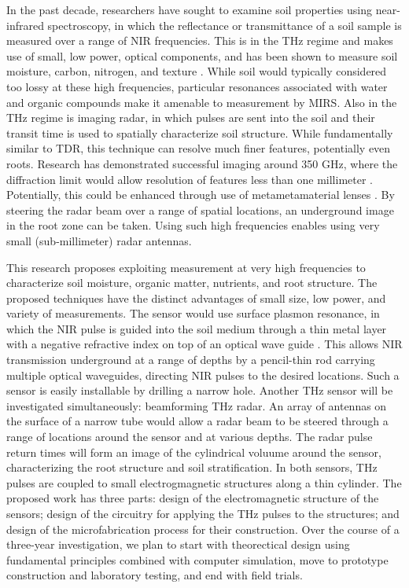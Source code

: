 \documentclass[11pt,letterpaper]{article}
\begin{document}
In the past decade, researchers have sought to examine soil properties using near-infrared spectroscopy, in which the reflectance or transmittance of a soil sample is measured over a range of NIR frequencies. This is in the THz regime and makes use of small, low power, optical components, and has been shown to measure soil moisture, carbon, nitrogen, and texture \cite{chang2001near}. While soil would typically considered too lossy at these high frequencies, particular resonances associated with water and organic compounds make it amenable to measurement by MIRS. Also in the THz regime is imaging radar, in which pulses are sent into the soil and their transit time is used to spatially characterize soil structure. While fundamentally similar to TDR, this technique can resolve much finer features, potentially even roots. Research has demonstrated successful imaging around 350 GHz, where the diffraction limit would allow resolution of features less than one millimeter \cite{dworak2011application}. Potentially, this could be enhanced through use of metametamaterial lenses \cite{}. By steering the radar beam over a range of spatial locations, an underground image in the root zone can be taken. Using such high frequencies enables using very small (sub-millimeter) radar antennas.

This research proposes exploiting measurement at very high frequencies to characterize soil moisture, organic matter, nutrients, and root structure. The proposed techniques have the distinct advantages of small size, low power, and variety of measurements. The sensor would use surface plasmon resonance, in which the NIR pulse is guided into the soil medium through a thin metal layer with a negative refractive index on top of an optical wave guide \cite{shibayama2016surface}. This allows NIR transmission underground at a range of depths by a pencil-thin rod carrying multiple optical waveguides, directing NIR pulses to the desired locations. Such a sensor is easily installable by drilling a narrow hole. Another THz sensor will be investigated simultaneously: beamforming THz radar. An array of antennas on the surface of a narrow tube would allow a radar beam to be steered through a range of locations around the sensor and at various depths. The radar pulse return times will form an image of the cylindrical voluume around the sensor, characterizing the root structure and soil stratification. In both sensors, THz pulses are coupled to small electrogmagnetic structures along a thin cylinder. The proposed work has three parts: design of the electromagnetic structure of the sensors; design of the circuitry for applying the THz pulses to the structures; and design of the microfabrication process for their construction. Over the course of a three-year investigation, we plan to start with theorectical design using fundamental principles combined with computer simulation, move to prototype construction and laboratory testing, and end with field trials.
\end{document}
